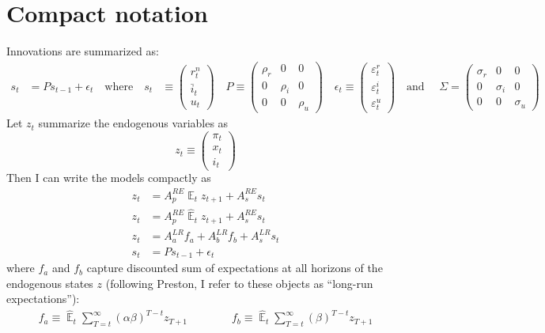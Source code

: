 \documentclass[11pt]{article}
\renewcommand{\[}{\begin{equation}}
\renewcommand{\]}{\end{equation}}
\DeclareMathOperator{\E}{\mathbb{E}}
\begin{document}
 \section{Compact notation}
Innovations are summarized as:
 \begin{align*}
 s_t & = P s_{t-1} + \epsilon_t 
 \quad \text{where} \quad 
 s_t & \equiv \begin{pmatrix} r_t^n \\ \bar{i}_t \\ u_t 
 \end{pmatrix} \quad 
 P  \equiv \begin{pmatrix} \rho_r & 0 & 0 \\ 0& \rho_i & 0 \\ 0&0& \rho_u 
 \end{pmatrix}  \quad 
 \epsilon_t \equiv \begin{pmatrix}\varepsilon_t^{r} \\ \varepsilon_t^{i}  \\ \varepsilon_t^{u} 
 \end{pmatrix}  \quad  \text{and } \quad \Sigma  =  \begin{pmatrix} \sigma_r & 0 & 0 \\ 0& \sigma_i & 0 \\ 0&0& \sigma_u 
 \end{pmatrix} 
 \end{align*}
 Let $z_t$ summarize the endogenous variables as
 \begin{equation}
 z_t \equiv \begin{pmatrix} \pi_t \\ x_t \\ i_t
 \end{pmatrix}
 \end{equation}
 Then I can write the models compactly as
 \begin{align}
z_t & = A_p^{RE} \E_t z_{t+1} + A_s^{RE} s_t \label{LOM_RE} \\
z_t & = A_p^{RE} \hat{\E}_t z_{t+1} + A_s^{RE} s_t \label{LOM_EE} \\
z_t & = A_a^{LR} f_a + A_b^{LR} f_b + A_s^{LR} s_t \label{LOM_LR} \\
s_t & = P s_{t-1} + \epsilon_t \label{exog}
\end{align}
 where $f_a$ and $f_b$ capture discounted sum of expectations at all horizons of the endogenous states $z$ (following Preston, I refer to these objects as ``long-run expectations''):
  \begin{align}
f_a  \equiv  \hat{\E}_t\sum_{T=t}^{\infty} (\alpha\beta)^{T-t } z_{T+1} \quad \quad \quad \quad f_b  \equiv \hat{\E}_t\sum_{T=t}^{\infty} (\beta)^{T-t } z_{T+1} \label{fafb}
\end{align}
\end{document}
